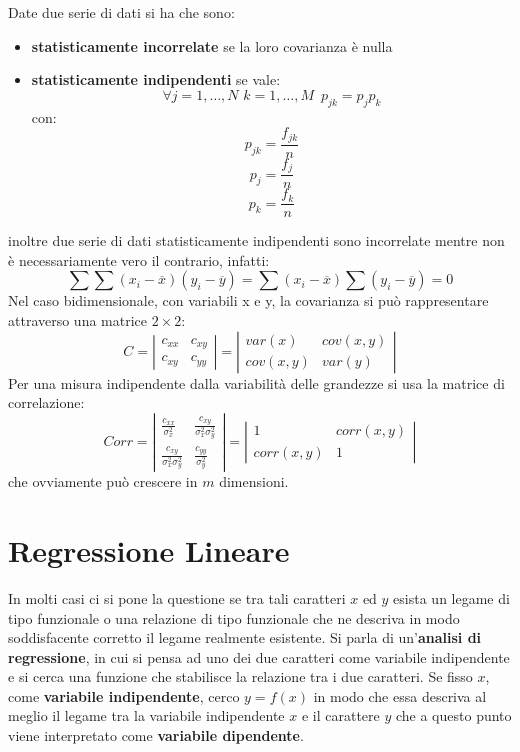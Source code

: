 \documentclass[a4paper,12pt, oneside]{book}
\begin{document}
Date due serie di dati si ha che sono:
\begin{itemize}
    \item \textbf{statisticamente incorrelate} se la loro covarianza è nulla
    \item \textbf{statisticamente indipendenti} se vale:
        \[ \forall j=1, \dots, N\,\,k=1, \dots, M\,\,\, p_{jk} = p_jp_k \]
             con:
            \[ p_{jk}=\frac{f_{jk}}{n} \]
            \[ p_{j}=\frac{f_{j}}{n} \]
            \[ p_{k}=\frac{f_{k}}{n} \]        
\end{itemize}
inoltre due serie di dati statisticamente indipendenti sono incorrelate mentre non è necessariamente vero il contrario, infatti:
\[ \sum \sum (x_i - \overline{x})(y_i - \overline{y}) = \sum (x_i - \overline{x}) \sum(y_i - \overline{y}) = 0 \]
Nel caso bidimensionale, con variabili x e y, la covarianza si può rappresentare attraverso una matrice $2 \times 2$:
\[ C = \left | \begin{matrix}
                c_{xx} & c_{xy}\\
                c_{xy} & c_	{yy}
                \end{matrix}\right| = \left|\begin{matrix}
                                            var(x) & cov(x,y)\\
                                            cov(x,y) & var(y)
                                            \end{matrix}\right| \]
Per una misura indipendente dalla variabilità delle grandezze si usa la matrice di correlazione:
\[ Corr=\left|\begin{matrix}
              \frac{c_{xx}}{\sigma_x^2} & \frac{c_{xy}}{\sigma_x^2\sigma_y^2} \\
              \frac{c_{xy}}{\sigma_x^2\sigma_y^2}   & \frac{c_{yy}}{\sigma_y^2} 
              \end{matrix}\right|=\left|\begin{matrix}
                                            1 & corr(x,y)\\
                                            corr(x,y) & 1
                                        \end{matrix}\right| \]
che ovviamente può crescere in $m$ dimensioni.

\section{Regressione Lineare}
In molti casi ci si pone la questione se tra tali caratteri $x$ ed $y$ esista un legame di tipo funzionale
o una relazione di tipo funzionale che ne descriva in modo soddisfacente corretto il legame realmente esistente.\newline
Si parla di un'\textbf{analisi di regressione}, in cui si pensa ad uno dei due caratteri come variabile indipendente e
si cerca una funzione che stabilisce la relazione tra i due caratteri.\newline
Se fisso $x$, come \textbf{variabile indipendente}, cerco $y = f(x)$ in modo che essa descriva al meglio
il legame tra la variabile indipendente $x$ e il carattere $y$ che a questo punto viene 
interpretato come \textbf{variabile dipendente}.
\end{document}
